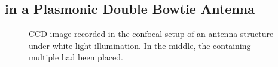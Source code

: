	\subsection{\sivs in a Plasmonic Double Bowtie Antenna}

		\begin{figure}[htp]
			\centering
			\caption{CCD image recorded in the confocal setup of an antenna structure under white light illumination. In the middle, the \nd containing multiple \sivs had been placed.}
			\label{fig::place_ccd}
		\end{figure}

